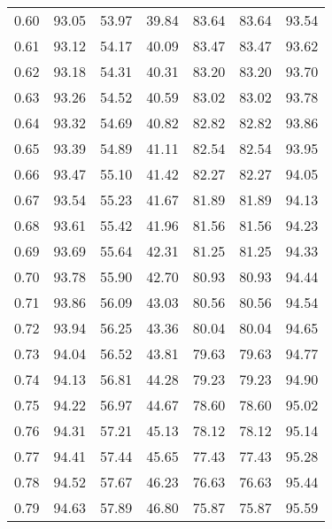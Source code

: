 \begin{tabular}{|c|c|c|c|c|c|c|}
      0.60 &     93.05 &     53.97 &      39.84 &   83.64 &      83.64 &         93.54 \\
      0.61 &     93.12 &     54.17 &      40.09 &   83.47 &      83.47 &         93.62 \\
      0.62 &     93.18 &     54.31 &      40.31 &   83.20 &      83.20 &         93.70 \\
      0.63 &     93.26 &     54.52 &      40.59 &   83.02 &      83.02 &         93.78 \\
      0.64 &     93.32 &     54.69 &      40.82 &   82.82 &      82.82 &         93.86 \\
      0.65 &     93.39 &     54.89 &      41.11 &   82.54 &      82.54 &         93.95 \\
      0.66 &     93.47 &     55.10 &      41.42 &   82.27 &      82.27 &         94.05 \\
      0.67 &     93.54 &     55.23 &      41.67 &   81.89 &      81.89 &         94.13 \\
      0.68 &     93.61 &     55.42 &      41.96 &   81.56 &      81.56 &         94.23 \\
      0.69 &     93.69 &     55.64 &      42.31 &   81.25 &      81.25 &         94.33 \\
      0.70 &     93.78 &     55.90 &      42.70 &   80.93 &      80.93 &         94.44 \\
      0.71 &     93.86 &     56.09 &      43.03 &   80.56 &      80.56 &         94.54 \\
      0.72 &     93.94 &     56.25 &      43.36 &   80.04 &      80.04 &         94.65 \\
      0.73 &     94.04 &     56.52 &      43.81 &   79.63 &      79.63 &         94.77 \\
      0.74 &     94.13 &     56.81 &      44.28 &   79.23 &      79.23 &         94.90 \\
      0.75 &     94.22 &     56.97 &      44.67 &   78.60 &      78.60 &         95.02 \\
      0.76 &     94.31 &     57.21 &      45.13 &   78.12 &      78.12 &         95.14 \\
      0.77 &     94.41 &     57.44 &      45.65 &   77.43 &      77.43 &         95.28 \\
      0.78 &     94.52 &     57.67 &      46.23 &   76.63 &      76.63 &         95.44 \\
      0.79 &     94.63 &     57.89 &      46.80 &   75.87 &      75.87 &         95.59 \\

\end{tabular}
